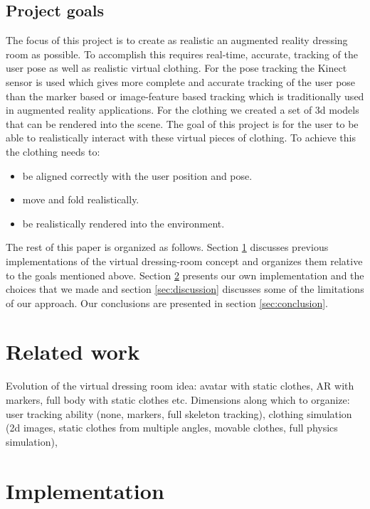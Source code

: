 \documentclass[a4paper]{article}
\begin{document}

\subsection{Project goals}
\label{sec:project_goals}

The focus of this project is to create as realistic an augmented reality dressing room as possible. To accomplish this requires real-time, accurate, tracking of the user pose as well as realistic virtual clothing. For the pose tracking the Kinect sensor is used which gives more complete and accurate tracking of the user pose than the marker based or image-feature based tracking which is traditionally used in augmented reality applications. For the clothing we created a set of 3d models that can be rendered into the scene. The goal of this project is for the user to be able to realistically interact with these virtual pieces of clothing. To achieve this the clothing needs to:
\begin{itemize}
\item be aligned correctly with the user position and pose.
\item move and fold realistically. 
\item be realistically rendered into the environment.
\end{itemize}

The rest of this paper is organized as follows. Section \ref{sec:related_work} discusses previous implementations of the virtual dressing-room concept and organizes them relative to the goals mentioned above. Section \ref{sec:implementation} presents our own implementation and the choices that we made and section \ref{sec:discussion} discusses some of the limitations of our approach. Our conclusions are presented in section \ref{sec:conclusion}.


\section{Related work}
\label{sec:related_work}

Evolution of the virtual dressing room idea: avatar with static clothes, AR with markers, full body with static clothes etc. Dimensions along which to organize: user tracking ability (none, markers, full skeleton tracking), clothing simulation (2d images, static clothes from multiple angles, movable clothes, full physics simulation),

\section{Implementation}
\label{sec:implementation}
\end{document}
